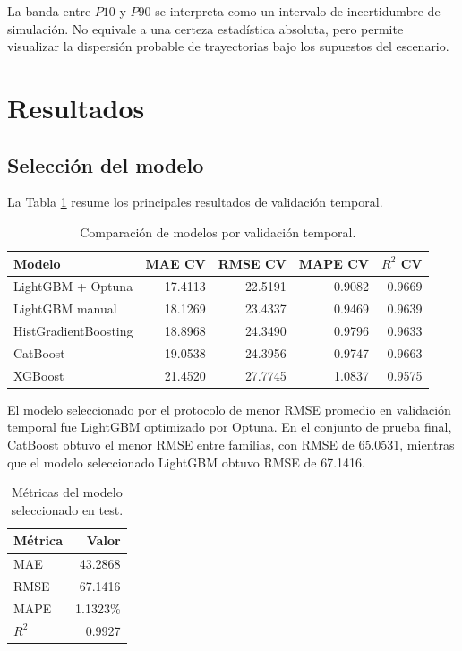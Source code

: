 \documentclass[12pt,letterpaper]{article}
\begin{document}
La banda entre $P10$ y $P90$ se interpreta como un intervalo de incertidumbre de simulación. No equivale a una certeza estadística absoluta, pero permite visualizar la dispersión probable de trayectorias bajo los supuestos del escenario.

\section{Resultados}
\subsection{Selección del modelo}
La Tabla \ref{tab:cv} resume los principales resultados de validación temporal.

\begin{table}[H]
\centering
\caption{Comparación de modelos por validación temporal.}
\label{tab:cv}
\begin{tabular}{lrrrr}
\toprule
Modelo & MAE CV & RMSE CV & MAPE CV & $R^2$ CV \\
\midrule
LightGBM + Optuna & 17.4113 & 22.5191 & 0.9082 & 0.9669 \\
LightGBM manual & 18.1269 & 23.4337 & 0.9469 & 0.9639 \\
HistGradientBoosting & 18.8968 & 24.3490 & 0.9796 & 0.9633 \\
CatBoost & 19.0538 & 24.3956 & 0.9747 & 0.9663 \\
XGBoost & 21.4520 & 27.7745 & 1.0837 & 0.9575 \\
\bottomrule
\end{tabular}
\end{table}

El modelo seleccionado por el protocolo de menor RMSE promedio en validación temporal fue LightGBM optimizado por Optuna. En el conjunto de prueba final, CatBoost obtuvo el menor RMSE entre familias, con RMSE de 65.0531, mientras que el modelo seleccionado LightGBM obtuvo RMSE de 67.1416.

\begin{table}[H]
\centering
\caption{Métricas del modelo seleccionado en test.}
\begin{tabular}{lr}
\toprule
Métrica & Valor \\
\midrule
MAE & 43.2868 \\
RMSE & 67.1416 \\
MAPE & 1.1323\% \\
$R^2$ & 0.9927 \\
\bottomrule
\end{tabular}
\end{table}
\end{document}
